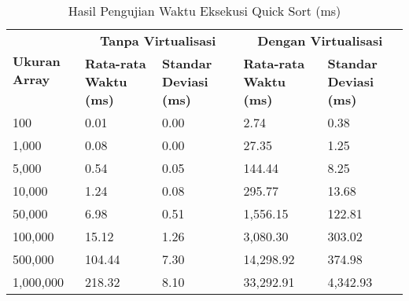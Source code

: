 \begin{table}[H] %
    \centering
    \caption{Hasil Pengujian Waktu Eksekusi Quick Sort (ms)}
    \label{tab:quick_sort_performance}
    \begin{tabularx}{\textwidth}{@{}|X|X|X|X|X|@{}}
    \hline
        \multirow{2}{*}{\textbf{Ukuran Array}} & \multicolumn{2}{c|}{\textbf{Tanpa Virtualisasi}} & \multicolumn{2}{c|}{\textbf{Dengan Virtualisasi}}\\
        \cline{2-5}
        & \textbf{Rata-rata Waktu (ms)} & \textbf{Standar Deviasi (ms)} & \textbf{Rata-rata Waktu (ms)} & \textbf{Standar Deviasi (ms)}\\
        \hline
        100                     & 0.01 & 0.00 & 2.74 & 0.38 \\
        \hline
        1,000                   & 0.08 & 0.00 & 27.35 & 1.25 \\
        \hline
        5,000                   & 0.54 & 0.05 & 144.44 & 8.25 \\
        \hline
        10,000                  & 1.24 & 0.08 & 295.77 & 13.68 \\
        \hline
        50,000                  & 6.98 & 0.51 & 1,556.15 & 122.81 \\
        \hline
        100,000                 & 15.12 & 1.26 & 3,080.30 & 303.02 \\
        \hline
        500,000                 & 104.44 & 7.30 & 14,298.92 & 374.98 \\
        \hline
        1,000,000               & 218.32 & 8.10 & 33,292.91 & 4,342.93 \\
        \hline
    \end{tabularx}
\end{table}

